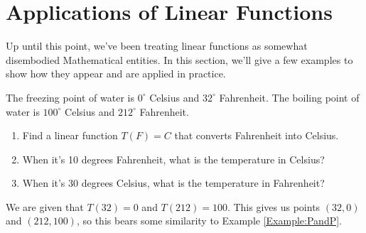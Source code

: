 \section{Applications of Linear Functions}\label{Section:ApplicationsLinear}

Up until this point, we've been treating linear functions as somewhat disembodied Mathematical entities.  In this section, we'll give a few examples to show how they appear and are applied in practice.


\begin{example}\label{Example:LinearTemp}

\Q The freezing point of water is $0^\circ$ Celsius and $32^\circ$ Fahrenheit.  The boiling point of water is $100^\circ$ Celsius and $212^\circ$ Fahrenheit.

\begin{enumerate}
    \item Find a linear function $T(F)=C$ that converts Fahrenheit into Celsius.
    \item When it's 10 degrees Fahrenheit, what is the temperature in Celsius?
    \item When it's 30 degrees Celsius, what is the temperature in Fahrenheit?
\end{enumerate}

\Sol We are given that $T(32)=0$ and $T(212)=100$.  This gives us points $(32,0)$ and $(212,100)$, so this bears some similarity to Example \ref{Example:PandP}.

\end{example}
